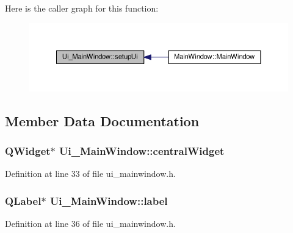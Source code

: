 Here is the caller graph for this function\+:\nopagebreak
\begin{figure}[H]
\begin{center}
\leavevmode
\includegraphics[width=350pt]{class_ui___main_window_acf4a0872c4c77d8f43a2ec66ed849b58_icgraph}
\end{center}
\end{figure}




\subsection{Member Data Documentation}
\subsubsection[{\texorpdfstring{central\+Widget}{centralWidget}}]{\setlength{\rightskip}{0pt plus 5cm}Q\+Widget$\ast$ Ui\+\_\+\+Main\+Window\+::central\+Widget}\hypertarget{class_ui___main_window_a30075506c2116c3ed4ff25e07ae75f81}{}\label{class_ui___main_window_a30075506c2116c3ed4ff25e07ae75f81}


Definition at line 33 of file ui\+\_\+mainwindow.\+h.

\subsubsection[{\texorpdfstring{label}{label}}]{\setlength{\rightskip}{0pt plus 5cm}Q\+Label$\ast$ Ui\+\_\+\+Main\+Window\+::label}\hypertarget{class_ui___main_window_ad9c89133780f28e6efa2ec17ceb9cff5}{}\label{class_ui___main_window_ad9c89133780f28e6efa2ec17ceb9cff5}


Definition at line 36 of file ui\+\_\+mainwindow.\+h.

